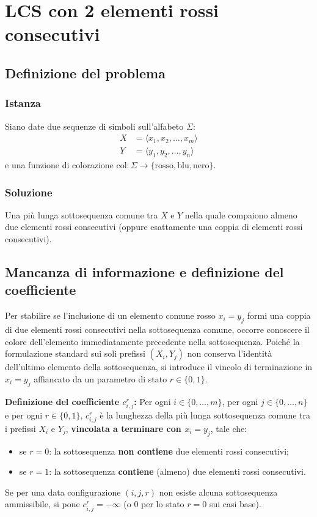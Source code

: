 \chapter{LCS con 2 elementi rossi consecutivi}

\section{Definizione del problema}

\subsection{Istanza}
Siano date due sequenze di simboli sull'alfabeto $\Sigma$:
\begin{align*}
    X &= \langle x_1, x_2, \dots, x_m \rangle \\
    Y &= \langle y_1, y_2, \dots, y_n \rangle
\end{align*}
e una funzione di colorazione $\text{col} : \Sigma \to \{\text{rosso}, \text{blu}, \text{nero}\}$.

\subsection{Soluzione}
Una più lunga sottosequenza comune tra $X$ e $Y$ nella quale compaiono almeno due elementi rossi consecutivi (oppure esattamente una coppia di elementi rossi consecutivi).

\section{Mancanza di informazione e definizione del coefficiente}
Per stabilire se l'inclusione di un elemento comune rosso $x_i = y_j$ formi una coppia di due elementi rossi consecutivi nella sottosequenza comune, occorre conoscere il colore dell'elemento immediatamente precedente nella sottosequenza. Poiché la formulazione standard sui soli prefissi $(X_i, Y_j)$ non conserva l'identità dell'ultimo elemento della sottosequenza, si introduce il vincolo di terminazione in $x_i = y_j$ affiancato da un parametro di stato $r \in \{0, 1\}$.

\medskip
\noindent
\textbf{Definizione del coefficiente $c_{i,j}^r$:} Per ogni $i \in \{0, \dots, m\}$, per ogni $j \in \{0, \dots, n\}$ e per ogni $r \in \{0, 1\}$, $c_{i,j}^r$ è la lunghezza della più lunga sottosequenza comune tra i prefissi $X_i$ e $Y_j$, \textbf{vincolata a terminare con $x_i = y_j$}, tale che:
\begin{itemize}
    \item se $r = 0$: la sottosequenza \textbf{non contiene} due elementi rossi consecutivi;
    \item se $r = 1$: la sottosequenza \textbf{contiene} (almeno) due elementi rossi consecutivi.
\end{itemize}
Se per una data configurazione $(i, j, r)$ non esiste alcuna sottosequenza ammissibile, si pone $c_{i,j}^r = -\infty$ (o $0$ per lo stato $r=0$ sui casi base).

